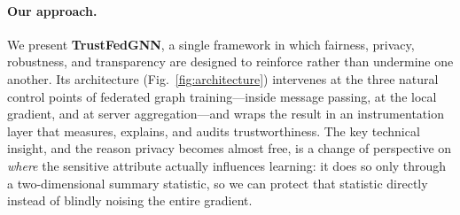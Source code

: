 \paragraph{Our approach.}
We present \textbf{TrustFedGNN}, a single framework in which fairness, privacy,
robustness, and transparency are designed to reinforce rather than undermine one
another. Its architecture (Fig.~\ref{fig:architecture}) intervenes at the three
natural control points of federated graph training---inside message passing, at
the local gradient, and at server aggregation---and wraps the result in an
instrumentation layer that measures, explains, and audits trustworthiness. The
key technical insight, and the reason privacy becomes almost free, is a change
of perspective on \emph{where} the sensitive attribute actually influences
learning: it does so only through a two-dimensional summary statistic, so we can
protect that statistic directly instead of blindly noising the entire gradient.

